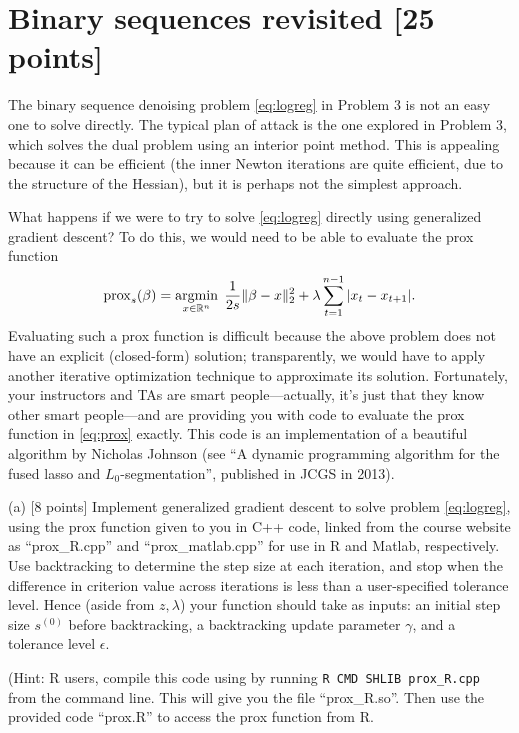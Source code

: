 \newcommand{\argmin}{\mathop{\mathrm{argmin}}}
\def\prox{\mathrm{prox}}

\section{Binary sequences revisited [25 points]}

The binary sequence denoising problem \eqref{eq:logreg} in Problem 3
is not an easy one to solve directly. The typical plan of attack is 
the one explored in Problem 3, which solves the dual problem using 
an interior point method. This is appealing because it can be efficient
(the inner Newton iterations are quite efficient, due to the structure
of the Hessian), but it is perhaps not the simplest approach. 

What happens if we were to try to solve \eqref{eq:logreg} directly
using generalized gradient descent? To do this, we would need
to be able to evaluate the prox function
\begin{equation}
\label{eq:prox}
\prox_s(\beta) = \argmin_{x\in\R^n} \;
\frac{1}{2s} \|\beta-x\|_2^2 
+ \lambda \sum_{t=1}^{n-1} |x_t-x_{t+1}|.
\end{equation}
Evaluating such a prox function is difficult because the above problem does 
not have an explicit (closed-form) solution; transparently, we would have 
to apply another iterative optimization technique to approximate its solution.
Fortunately, your instructors and TAs are smart people---actually, it's just
that they know other smart people---and are providing you with code to evaluate
the prox function in \eqref{eq:prox} exactly.  This code is an implementation
of a beautiful algorithm by Nicholas Johnson (see ``A dynamic programming
algorithm for the fused lasso and $L_0$-segmentation'', published in JCGS
in 2013). 

(a) [8 points] Implement generalized gradient descent to solve problem
\eqref{eq:logreg}, using the prox function given to you in C++ code,
linked from the course website as ``prox\_R.cpp'' and
``prox\_matlab.cpp'' for use in R and Matlab, respectively.  Use
backtracking to determine the step size at each iteration, and stop
when the difference in criterion value across iterations is less than
a user-specified tolerance level. Hence (aside from $z,\lambda$) your
function should take as inputs: an initial step size $s^{(0)}$ before
backtracking, a backtracking update parameter $\gamma$, and a
tolerance level $\epsilon$.  

(Hint: R users, compile this code using by running 
{\tt R CMD SHLIB prox\_R.cpp} from the command line. This will give  
you the file ``prox\_R.so''. Then use the provided code ``prox.R'' to 
access the prox function from R.

